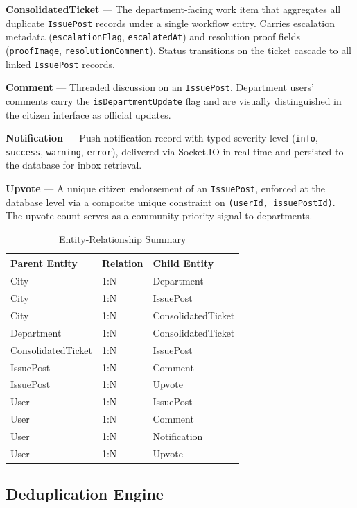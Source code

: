 \documentclass[conference]{IEEEtran}
\begin{document}
\textbf{ConsolidatedTicket} --- The department-facing work item that aggregates all duplicate \texttt{IssuePost} records under a single workflow entry. Carries escalation metadata (\texttt{escalationFlag}, \texttt{escalatedAt}) and resolution proof fields (\texttt{proofImage}, \texttt{resolutionComment}). Status transitions on the ticket cascade to all linked \texttt{IssuePost} records.

\textbf{Comment} --- Threaded discussion on an \texttt{IssuePost}. Department users' comments carry the \texttt{isDepartmentUpdate} flag and are visually distinguished in the citizen interface as official updates.

\textbf{Notification} --- Push notification record with typed severity level (\texttt{info}, \texttt{success}, \texttt{warning}, \texttt{error}), delivered via Socket.IO in real time and persisted to the database for inbox retrieval.

\textbf{Upvote} --- A unique citizen endorsement of an \texttt{IssuePost}, enforced at the database level via a composite unique constraint on \texttt{(userId, issuePostId)}. The upvote count serves as a community priority signal to departments.

\begin{table}[htbp]
\caption{Entity-Relationship Summary}
\begin{center}
\begin{tabular}{lll}
\toprule
\textbf{Parent Entity} & \textbf{Relation} & \textbf{Child Entity} \\
\midrule
City & 1:N & Department \\
City & 1:N & IssuePost \\
City & 1:N & ConsolidatedTicket \\
Department & 1:N & ConsolidatedTicket \\
ConsolidatedTicket & 1:N & IssuePost \\
IssuePost & 1:N & Comment \\
IssuePost & 1:N & Upvote \\
User & 1:N & IssuePost \\
User & 1:N & Comment \\
User & 1:N & Notification \\
User & 1:N & Upvote \\
\bottomrule
\end{tabular}
\label{tab:er}
\end{center}
\end{table}

\subsection{Deduplication Engine}
\end{document}
